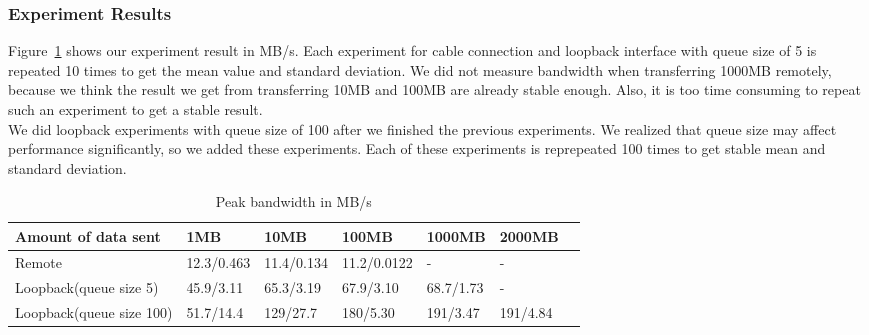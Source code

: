\documentclass{article} %
\begin{document}
\subsubsection{Experiment Results}

Figure~\ref{table:peak_bandwidth} shows our experiment result in MB/s. Each experiment for cable connection and loopback interface with queue size of 5 is repeated 10 times to get the mean value and standard deviation. We did not measure bandwidth when transferring 1000MB remotely, because we think the result we get from transferring 10MB and 100MB are already stable enough. Also, it is too time consuming to repeat such an experiment to get a stable result.\\
We did loopback experiments with queue size of 100 after we finished the previous experiments. We realized that queue size may affect performance significantly, so we added these experiments. Each of these experiments is reprepeated 100 times to get stable mean and standard deviation.\\

\begin{table}
  \begin{center}
    \caption{Peak bandwidth in MB/s}
    \begin{tabular}{|l|l|l|l|l|l|l|}
      \hline
      Amount of data sent      & 1MB        & 10MB       & 100MB       & 1000MB    & 2000MB   \\ \hline
      Remote                   & 12.3/0.463 & 11.4/0.134 & 11.2/0.0122 & -         & -        \\ \hline
      Loopback(queue size 5)   & 45.9/3.11  & 65.3/3.19  & 67.9/3.10   & 68.7/1.73 & -        \\ \hline
      Loopback(queue size 100) & 51.7/14.4  & 129/27.7   & 180/5.30    & 191/3.47  & 191/4.84 \\ \hline
    \end{tabular}
    \label{table:peak_bandwidth}
  \end{center}
\end{table}
\end{document}
